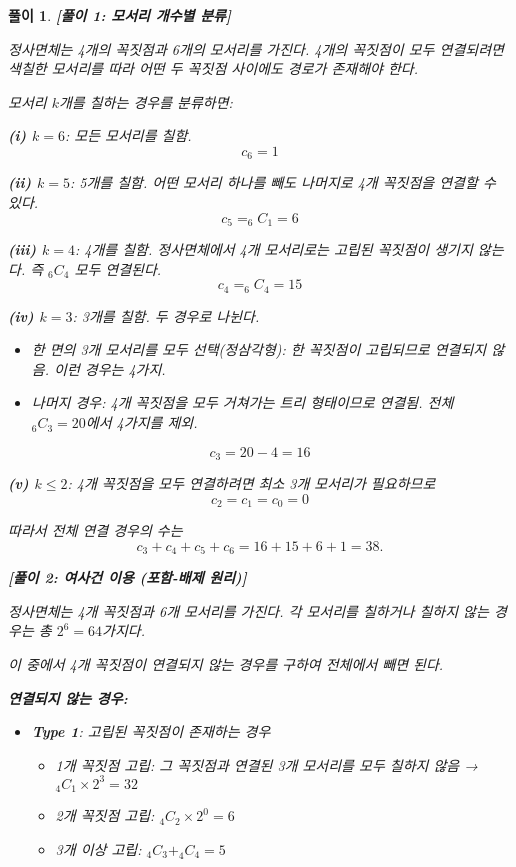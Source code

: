 \documentclass[12pt,a4paper]{article}
\theoremstyle{test_form}
\newtheorem*{solution}{풀이}
\begin{document}
\begin{solution}

\textbf{[풀이 1: 모서리 개수별 분류]}

\setlength{\parindent}{0pt}

정사면체는 4개의 꼭짓점과 6개의 모서리를 가진다. 4개의 꼭짓점이 모두 연결되려면 색칠한 모서리를 따라 어떤 두 꼭짓점 사이에도 경로가 존재해야 한다.

모서리 \(k\)개를 칠하는 경우를 분류하면:

\textbf{(i) \(k=6\)}: 모든 모서리를 칠함.
\[
c_6=1
\]

\textbf{(ii) \(k=5\)}: 5개를 칠함. 어떤 모서리 하나를 빼도 나머지로 4개 꼭짓점을 연결할 수 있다.
\[
c_5=_6C_1=6
\]

\textbf{(iii) \(k=4\)}: 4개를 칠함. 정사면체에서 4개 모서리로는 고립된 꼭짓점이 생기지 않는다. 즉 \(_6C_4\) 모두 연결된다.
\[
c_4=_6C_4=15
\]

\textbf{(iv) \(k=3\)}: 3개를 칠함. 두 경우로 나뉜다.
\begin{itemize}
\item 한 면의 3개 모서리를 모두 선택(정삼각형): 한 꼭짓점이 고립되므로 \emph{연결되지 않음}. 이런 경우는 4가지.
\item 나머지 경우: 4개 꼭짓점을 모두 거쳐가는 트리 형태이므로 \emph{연결됨}. 전체 \(_6C_3=20\)에서 4가지를 제외.
\end{itemize}
\[
c_3=20-4=16
\]

\textbf{(v) \(k\le 2\)}: 4개 꼭짓점을 모두 연결하려면 최소 3개 모서리가 필요하므로
\[
c_2=c_1=c_0=0
\]

따라서 전체 연결 경우의 수는
\[
c_3+c_4+c_5+c_6=16+15+6+1=38.
\]

\vspace{0.5cm}

\textbf{[풀이 2: 여사건 이용 (포함-배제 원리)]}

정사면체는 4개 꼭짓점과 6개 모서리를 가진다. 각 모서리를 칠하거나 칠하지 않는 경우는 총 \(2^6 = 64\)가지다.

이 중에서 4개 꼭짓점이 \emph{연결되지 않는} 경우를 구하여 전체에서 빼면 된다.

\textbf{연결되지 않는 경우:}
\begin{itemize}
\item \textbf{Type 1}: 고립된 꼭짓점이 존재하는 경우
  \begin{itemize}
  \item 1개 꼭짓점 고립: 그 꼭짓점과 연결된 3개 모서리를 모두 칠하지 않음 → \(_4C_1 \times 2^3 = 32\)
  \item 2개 꼭짓점 고립: \(_4C_2 \times 2^0 = 6\)
  \item 3개 이상 고립: \(_4C_3 + _4C_4 = 5\)
  \end{itemize}


\end{itemize}
\end{solution}
\end{document}
